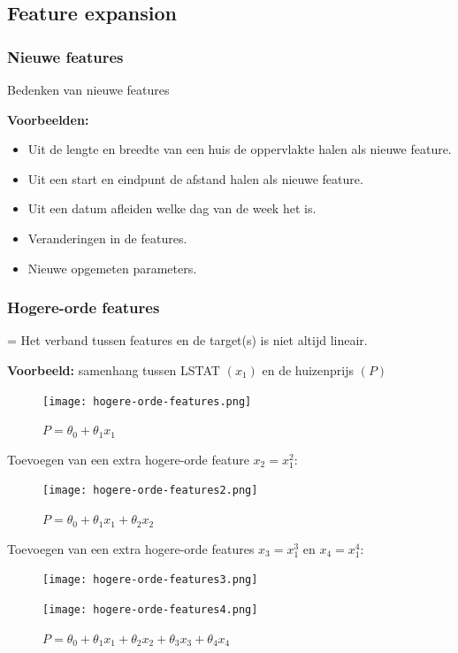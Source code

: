 \documentclass{article}
\begin{document}
\subsection{Feature expansion}

\subsubsection{Nieuwe features}

Bedenken van nieuwe features

\textbf{Voorbeelden:}

\begin{itemize}
    \item Uit de lengte en breedte van een huis de oppervlakte halen als nieuwe feature.
    \item Uit een start en eindpunt de afstand halen als nieuwe feature.
    \item Uit een datum afleiden welke dag van de week het is.
    \item Veranderingen in de features.
    \item Nieuwe opgemeten parameters.
\end{itemize}

\subsubsection{Hogere-orde features}

= Het verband tussen features en de target(s) is niet altijd lineair.

\textbf{Voorbeeld:} samenhang tussen LSTAT $(x_1)$ en de huizenprijs $(P)$

\begin{figure}[H]
    \centering
    \texttt{[image: hogere-orde-features.png]}
    \caption{$P = \theta_0 + \theta_1x_1$}
\end{figure}

Toevoegen van een extra hogere-orde feature $x_2 = x^2_1$:

\begin{figure}[H]
    \centering
    \texttt{[image: hogere-orde-features2.png]}
    \caption{$P = \theta_0 + \theta_1x_1 + \theta_2x_2$ }
\end{figure}

Toevoegen van een extra hogere-orde features $x_3 = x^3_1$ en $x_4 = x^4_1$:

\begin{figure}[H]
    \centering
    \texttt{[image: hogere-orde-features3.png]}
    \caption{$P = \theta_0 + \theta_1x_1 + \theta_2x_2 + \theta_3x_3$ }
    \texttt{[image: hogere-orde-features4.png]}
    \caption{$P = \theta_0 + \theta_1x_1 + \theta_2x_2 + \theta_3x_3 + \theta_4x_4$}
\end{figure}
\end{document}
